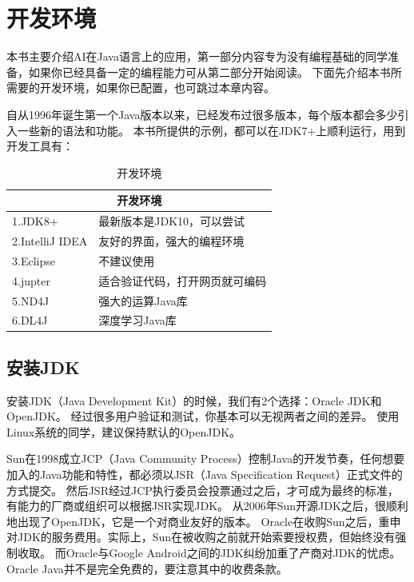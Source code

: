 \chapter{开发环境}
\label{chap:java_dev_environment}

本书主要介绍AI在Java语言上的应用，第一部分内容专为没有编程基础的同学准备，如果你已经具备一定的编程能力可从第二部分开始阅读。
下面先介绍本书所需要的开发环境，如果你已配置，也可跳过本章内容。

自从1996年诞生第一个Java版本以来，已经发布过很多版本，每个版本都会多少引入一些新的语法和功能。
本书所提供的示例，都可以在JDK7+上顺利运行，用到开发工具有：

\begin{table}[!htbp]\centering
\small
\begin{tabular}{|p{4cm}|p{8cm}|}
\hline
\multicolumn{2}{|c|}{开发环境}\\
\hline
1.JDK8+&最新版本是JDK10，可以尝试\\
\hline
2.IntelliJ IDEA&友好的界面，强大的编程环境\\
\hline
3.Eclipse&不建议使用\\
\hline
4.jupter&适合验证代码，打开网页就可编码\\
\hline
5.ND4J&强大的运算Java库\\
\hline
6.DL4J&深度学习Java库\\
\hline
\end{tabular}
\caption{开发环境}
\label{tab:part1_dev_env}
\end{table}

\section{安装JDK}
安装JDK（Java Development Kit）的时候，我们有2个选择：Oracle JDK和OpenJDK。
经过很多用户验证和测试，你基本可以无视两者之间的差异。
使用Linux系统的同学，建议保持默认的OpenJDK。

Sun在1998成立JCP（Java Community Process）控制Java的开发节奏，任何想要加入的Java功能和特性，都必须以JSR（Java Specification Request）正式文件的方式提交。
然后JSR经过JCP执行委员会投票通过之后，才可成为最终的标准，有能力的厂商或组织可以根据JSR实现JDK。
从2006年Sun开源JDK之后，很顺利地出现了OpenJDK，它是一个对商业友好的版本。
Oracle在收购Sun之后，重申对JDK的服务费用。实际上，Sun在被收购之前就开始索要授权费，但始终没有强制收取。
而Oracle与Google Android之间的JDK纠纷加重了产商对JDK的忧虑。
Oracle Java并不是完全免费的，要注意其中的收费条款。

